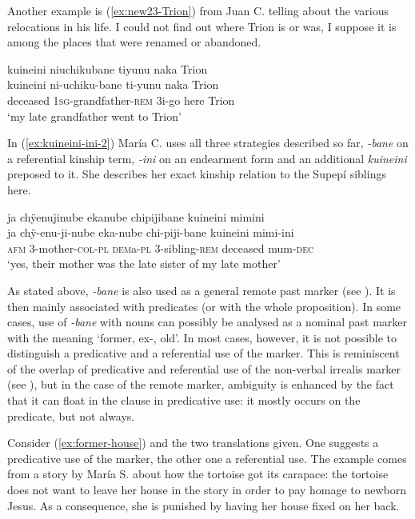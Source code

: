 Another example is (\ref{ex:new23-Trion}) from Juan C. telling about the various relocations in his life. I could not find out where Trion is or was, I suppose it is among the places that were renamed or abandoned.

\ea\label{ex:new23-Trion}
\begingl
\glpreamble kuineini niuchikubane tiyunu naka Trion\\
\gla kuineini ni-uchiku-bane ti-yunu naka Trion\\
\glb deceased 1\textsc{sg}-grandfather-\textsc{rem} 3i-go here Trion\\
\glft ‘my late grandfather went to Trion’
\endgl
\trailingcitation{[mqx-p110826l.440-442]}
\xe

In (\ref{ex:kuineini-ini-2}) María C. uses all three strategies described so far, \textit{-bane} on a referential kinship term, \textit{-ini} on an endearment form and an additional \textit{kuineini} preposed to it. She describes her exact kinship relation to the Supepí siblings here. 

\ea\label{ex:kuineini-ini-2}
\begingl 
\glpreamble ja chÿenujinube ekanube chipijibane kuineini mimini\\
\gla ja chÿ-enu-ji-nube eka-nube chi-piji-bane kuineini mimi-ini\\ 
\glb \textsc{afm} 3-mother-\textsc{col}-\textsc{pl} \textsc{dem}a-\textsc{pl} 3-sibling-\textsc{rem} deceased mum-\textsc{dec}\\ 
\glft ‘yes, their mother was the late sister of my late mother’\\ 
\endgl
\trailingcitation{[cux-c120410ls.124-125]}
\xe

As stated above, \textit{-bane} is also used as a general remote past marker (see ). It is then mainly associated with predicates (or with the whole proposition). In some cases, use of \textit{-bane} with nouns can possibly be analysed as a nominal past marker with the meaning ‘former, ex-, old’. In most cases, however, it is not possible to distinguish a predicative and a referential use of the marker. This is reminiscent of the overlap of predicative and referential use of the non-verbal irrealis marker (see ), but in the case of the remote marker, ambiguity is enhanced by the fact that it can float in the clause in predicative use: it mostly occurs on the predicate, but not always. 

Consider (\ref{ex:former-house}) and the two translations given. One suggests a predicative use of the marker, the other one a referential use. The example comes from a story by María S. about how the tortoise got its carapace: the tortoise does not want to leave her house in the story in order to pay homage to newborn Jesus. As a consequence, she is punished by having her house fixed on her back.

